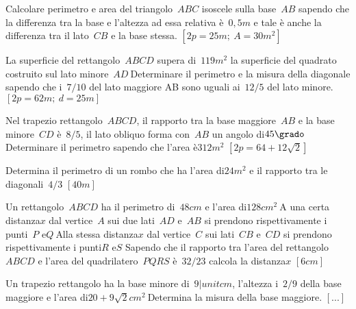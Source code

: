 \begin{multicols}{2}
\begin{esercizio}[\Ast]
 \label{ese:3.138}
Calcolare perimetro e area del triangolo~\(ABC\) isoscele sulla base~\(AB\) 
sapendo
che la differenza tra la base e l'altezza ad essa relativa 
è~\(0,5\unit{m}\) 
e 
tale
è anche la differenza tra il lato~\(CB\) e la base stessa.
\hfill\(\left[2p=25\unit{m};~A=30\unit{m^2}\right]\)
\end{esercizio}

\begin{esercizio}[\Ast]
 \label{ese:3.139}
La superficie del rettangolo~\(ABCD\) supera di~\(119\unit{m^2}\) la 
superficie 
del quadrato
costruito sul lato minore~\(AD~\)Determinare il perimetro e la misura della
diagonale sapendo che i~\(7/10\) del lato maggiore AB sono uguali 
ai~\(12/5\) 
del
lato minore.
\hfill\(\left[2p=62\unit{m};~d=25\unit{m}\right]\)
\end{esercizio}

\begin{esercizio}[\Ast]
 \label{ese:3.140}
Nel trapezio rettangolo~\(ABCD\), il rapporto tra la base maggiore~\(AB\) e 
la 
base
minore~\(CD\) è~\(8/5\), il lato obliquo forma con~\(AB\) un angolo di\( 
45\grado~\)Determinare il perimetro sapendo che l'area è\(312\unit{m^2}\)
\hfill\(\left[2p = 64 + 12 \sqrt{2}\right]\)
\end{esercizio}

\begin{esercizio}[\Ast]
 \label{ese:3.141}
Determina il perimetro di un rombo che ha l'area di\(24\unit{m^2}\) e il 
rapporto 
tra le diagonali~\(4/3\)
\hfill\(\left[40\unit{m}\right]\)
\end{esercizio}

\begin{esercizio}[\Ast]
 \label{ese:3.142}
Un rettangolo~\(ABCD\) ha il perimetro di~\(48\unit{cm}\) e l'area di\( 
128\unit{cm^2}~\)A una certa
distanza\(x\) dal vertice~\(A\) sui due lati~\(AD\) e~\(AB\) si prendono 
rispettivamente i
punti~\(P\) e\( Q~\)Alla stessa distanza\( x\) dal vertice~\(C\) sui 
lati~\(CB\) 
e~\(CD\) si
prendono rispettivamente i punti\( R\) e\( S\) Sapendo che il rapporto tra 
l'area
del rettangolo~\(ABCD\) e l'area del quadrilatero~\(PQRS\) è~\(32/23\) 
calcola 
la
distanza\(x\)
\hfill\(\left[6\unit{cm}\right]\)
\end{esercizio}

\begin{esercizio}
 \label{ese:3.143}
Un trapezio rettangolo ha la base minore di~\(9|unit{cm}\), l'altezza 
i~\(2/9\) 
della base
maggiore e l'area di\(20 + 9 \sqrt{2}\unit{cm^{2}}~\)Determina la misura 
della 
base maggiore.
\hfill\(\left[...\right]\)
\end{esercizio}


\end{multicols}
